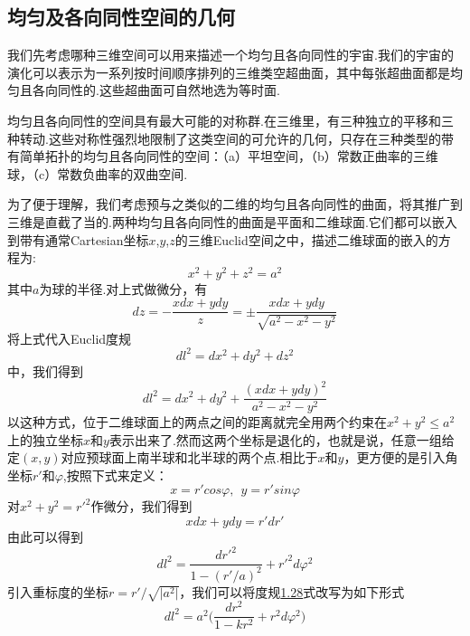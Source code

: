 \documentclass[a4paper]{book}
\begin{document}
\subsection{均匀及各向同性空间的几何}
我们先考虑哪种三维空间可以用来描述一个均匀且各向同性的宇宙.我们的宇宙的演化可以表示为一系列按时间顺序排列的三维类空超曲面，其中每张超曲面都是均匀且各向同性的.这些超曲面可自然地选为等时面.\par 
均匀且各向同性的空间具有最大可能的对称群.在三维里，有三种独立的平移和三种转动.这些对称性强烈地限制了这类空间的可允许的几何，只存在三种类型的带有简单拓扑的均匀且各向同性的空间：（a）平坦空间，（b）常数正曲率的三维球，（c）常数负曲率的双曲空间.\par 
为了便于理解，我们考虑预与之类似的二维的均匀且各向同性的曲面，将其推广到三维是直截了当的.两种均匀且各向同性的曲面是平面和二维球面.它们都可以嵌入到带有通常Cartesian坐标$x$,$y$,$z$的三维Euclid空间之中，描述二维球面的嵌入的方程为:
\begin{equation}
	x^2+y^2+z^2=a^2
\end{equation}
其中$a$为球的半径.对上式做微分，有
\begin{equation}
	dz=-\frac{xdx+ydy}{z}=\pm \frac{xdx+ydy}{\sqrt{a^2-x^2-y^2}}
\end{equation}
将上式代入Euclid度规
\begin{equation}
	dl^2=dx^2+dy^2+dz^2
\end{equation}
中，我们得到
\begin{equation}
	dl^2=dx^2+dy^2+\frac{(xdx+ydy)^2}{a^2-x^2-y^2}
\end{equation}
以这种方式，位于二维球面上的两点之间的距离就完全用两个约束在$x^2+y^2\leq a^2$上的独立坐标$x$和$y$表示出来了.然而这两个坐标是退化的，也就是说，任意一组给定$(x,y)$对应预球面上南半球和北半球的两个点.相比于$x$和$y$，更方便的是引入角坐标$r'$和$\varphi $,按照下式来定义：
\begin{equation}
	x=r'cos\varphi ,~~y=r'sin\varphi
\end{equation}
对$x^2+y^2=r'^2$作微分，我们得到
\begin{equation}
	xdx+ydy=r'dr'
\end{equation}
由此可以得到
\begin{equation}\label{1.28}
	dl^2=\frac{dr'^2}{1-(r'/a)^2}+r'^2d\varphi^2
\end{equation}
引入重标度的坐标$r=r'/\sqrt{\lvert a^2 \rvert}$，我们可以将度规\hyperref[1.28]{1.28}式改写为如下形式
\begin{equation}
	dl^2=a^2\Big(\frac{dr^2}{1-kr^2}+r^2d\varphi^2\Big)
\end{equation}
\end{document}
